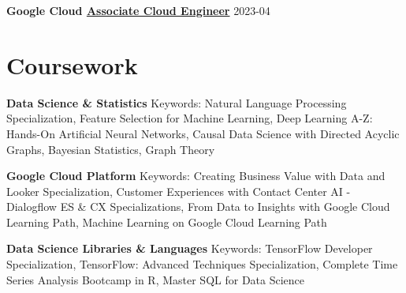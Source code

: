 \documentclass[a4paper,9pt]{extarticle}
\begin{document}
\noindent
\textbf{Google Cloud \href{https://google.accredible.com/d3ef369f-9c2c-486a-bda6-943a74f70dff}{Associate Cloud Engineer}} \hfill 2023-04

\section*{Coursework}

\noindent
\textbf{Data Science \& Statistics}
Keywords: Natural Language Processing Specialization, Feature Selection for Machine Learning, Deep Learning A-Z: Hands-On Artificial Neural Networks, Causal Data Science with Directed Acyclic Graphs, Bayesian Statistics, Graph Theory

\noindent
\textbf{Google Cloud Platform}
Keywords: Creating Business Value with Data and Looker Specialization, Customer Experiences with Contact Center AI - Dialogflow ES \& CX Specializations, From Data to Insights with Google Cloud Learning Path, Machine Learning on Google Cloud Learning Path

\noindent
\textbf{Data Science Libraries \& Languages}
Keywords: TensorFlow Developer Specialization, TensorFlow: Advanced Techniques Specialization, Complete Time Series Analysis Bootcamp in R, Master SQL for Data Science
\end{document}
